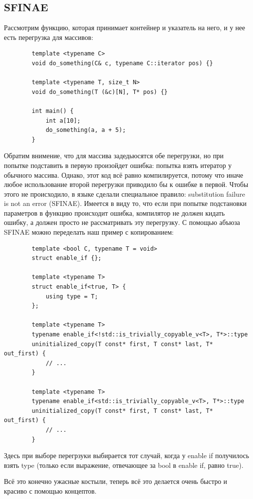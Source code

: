 \documentclass[12pt, a4paper]{article}
\begin{document}
	\subsection{SFINAE}
	Рассмотрим функцию, которая принимает контейнер и указатель на него, и у нее есть перегрузка для массивов:
	\begin{verbatim}
		template <typename C>
		void do_something(C& c, typename C::iterator pos) {}
		
		template <typename T, size_t N>
		void do_something(T (&c)[N], T* pos) {}
		
		int main() {
			int a[10];
			do_something(a, a + 5);
		}
	\end{verbatim}
	Обратим внимение, что для массива задедьюсятся обе перегрузки, но при попытке подставить в первую произойдет ошибка: попытка взять итератор у обычного массива. Однако, этот код всё равно компилируется, потому что иначе любое использование второй перегрузки приводило бы к ошибке в первой. Чтобы этого не происходило, в языке сделали специальное правило: substitution failure is not an error (SFINAE). Имеется в виду то, что если при попытке подстановки параметров в функцию происходит ошибка, компилятор не должен кидать ошибку, а должен просто не рассматривать эту перегрузку. С помощью абъюза SFINAE можно переделать наш пример с копированием:
	\begin{verbatim}
		template <bool C, typename T = void>
		struct enable_if {};
		
		template <typename T>
		struct enable_if<true, T> {
			using type = T;
		};
		
		template <typename T>
		typename enable_if<!std::is_trivially_copyable_v<T>, T*>::type
		uninitialized_copy(T const* first, T const* last, T* out_first) {
			// ...
		}
		
		template <typename T>
		typename enable_if<std::is_trivially_copyable_v<T>, T*>::type
		uninitialized_copy(T const* first, T const* last, T* out_first) {
			// ...
		}
	\end{verbatim}
	Здесь при выборе перегрзуки выбирается тот случай, когда у enable if получилось взять type (только если выражение, отвечающее за bool в enable if, равно true).
	\\\par Всё это конечно ужасные костыли, теперь всё это делается очень быстро и красиво с помощью концептов.
\end{document}
